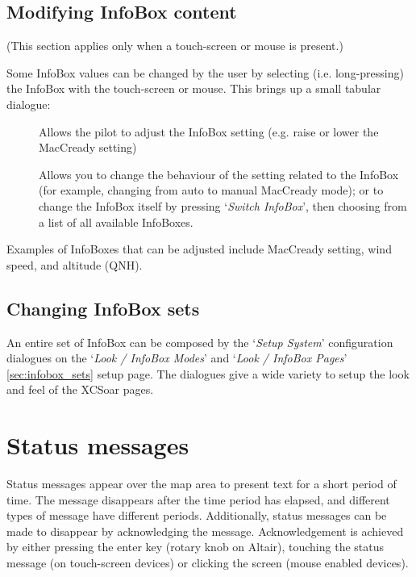 \subsection*{Modifying InfoBox content}

(This section applies only when a touch-screen or mouse is present.)

Some InfoBox values can be changed by the user by selecting (i.e. long-pressing) the
InfoBox with the touch-screen or mouse.  This brings up a small tabular dialogue:

\begin{description}
\item[]  
  Allows the pilot to adjust the InfoBox setting (e.g. raise or lower the 
  MacCready setting)

\item[]
  Allows you to change the behaviour of the setting related to the InfoBox 
  (for example, changing from auto to manual MacCready mode); or 
  to change the InfoBox itself by pressing `{\it Switch InfoBox}', then 
  choosing from a list of all available InfoBoxes.

\end{description}

Examples of InfoBoxes that can
be adjusted include MacCready setting, wind speed, and altitude (QNH).


\subsection*{Changing InfoBox sets}

An entire set of InfoBox can be composed by the `{\it Setup System}' configuration 
dialogues on the `{\it Look / InfoBox Modes}' and `{\it Look / InfoBox Pages}' 
\ref{sec:infobox_sets} setup page. 
The dialogues give a wide variety to setup the look and feel of the XCSoar pages.  


\section{Status messages}

Status messages appear over the map area to present text for a short period of
time.  The message disappears after the time period has elapsed, and different
types of message have different periods. Additionally, status messages can be
made to disappear by acknowledging the message.  Acknowledgement is achieved by
either pressing the enter key (rotary knob on Altair), touching the status
message (on touch-screen devices) or clicking the screen (mouse enabled devices).

